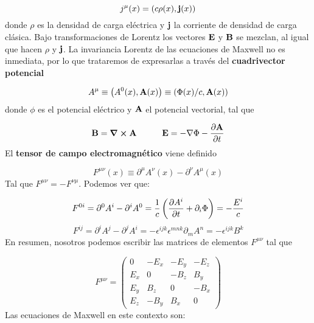 \begin{equation}
	j^\mu (x) = \left( c\rho(x),\mathbf{j}(x) \right)
\end{equation}
donde $\rho$ es la densidad de carga eléctrica y $\mathbf{j}$ la corriente de densidad de carga clásica. Bajo transformaciones de Lorentz los vectores $\mathbf{E}$ y $\mathbf{B}$ se mezclan, al igual que hacen $\rho$ y $\mathbf{j}$. La invariancia Lorentz de las ecuaciones de Maxwell no es inmediata, por lo que trataremos de expresarlas a través del \textbf{cuadrivector potencial}

\begin{equation}
	A^\mu \equiv \left( A^0 (x),\mathbf{A}(x) \right) \equiv \left( \Phi(x)/c,\mathbf{A}(x) \right)
\end{equation}
donde $\phi$ es el potencial eléctrico y $\mathbf{A}$ el potencial vectorial, tal que

\begin{equation}
	\mathbf{B} = \curl \mathbf{A} \quad \quad \quad \mathbf{E} = - \nabla \Phi - \frac{\partial \mathbf{A}}{\partial t}
\end{equation}
El \textbf{tensor de campo electromagnético} viene definido

\begin{equation}
	F^{\mu \nu} (x) \equiv \partial^\mu A^\nu (x) - \partial^\nu A^\mu (x)
\end{equation}
Tal que $F^{\mu \nu} = - F^{\nu \mu}$. Podemos ver que:

\begin{equation}
	F^{0i} = \partial^0 A^i - \partial^i A^0 = \frac{1}{c} \left( \frac{\partial A^i}{\partial t} + \partial_i \Phi \right) = - \frac{E^i}{c}
\end{equation}
\begin{equation}
	F^{ij} = \partial^i A^j - \partial^j A^i = - \epsilon^{ijk}\epsilon^{mnk} \partial_m A^n =  - \epsilon^{ijk} B^k
\end{equation}
En resumen, nosotros podemos escribir las matrices de elementos $F^{\mu \nu}$ tal que

\begin{equation}
	F^{\mu \nu} = 
	\begin{pmatrix}
		0 & -E_x & -E_y & -E_z \\
		E_x & 0 & -B_z & B_y \\
		E_y & B_z & 0 & -B_x \\
		E_z & -B_y & B_x & 0
	\end{pmatrix}
\end{equation}
Las ecuaciones de Maxwell en este contexto son:

